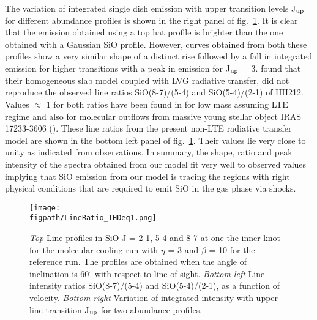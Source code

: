 \documentclass[useAMS,usenatbib]{mn2e}
\newcommand{\figpath}{/Users/bhargavvaidya/MyProject/work/Leeds_Uni/SiOJets_New/PAPER/PFIGS/}
\begin{document}
The variation of integrated single dish emission with upper transition
levels J$_{\rm up}$ for different abundance profiles is shown in the
right panel of fig.~\ref{fig:lineratio}. It is clear that the emission
obtained using a top hat profile is brighter than the one obtained
with a Gaussian SiO profile. However, curves obtained from
both these profiles show a very similar shape of a distinct rise followed by a fall in
integrated emission for higher transitions with a peak in
emission for J$_{\rm up}$ = 3. \cite{Nisini:2007p13128} found that
their homogeneous slab model coupled with LVG radiative transfer, did
not reproduce the observed line ratios SiO(8-7)/(5-4) and
SiO(5-4)/(2-1) of HH212. Values $\approx$ 1 for both ratios have been
found in for low mass assuming LTE regime \citep{Cabrit:2007p13804,
  Lee:2008p13697} and also for molecular outflows from massive
young stellar object IRAS 17233-3606 (\citealt{Leurini:2013p13165}).
These line ratios from the present
non-LTE radiative transfer model are shown in the bottom left panel of
fig.~\ref{fig:lineratio}. Their values lie very close to unity as
indicated from observations. 
In summary, the shape, ratio and peak intensity of the spectra
obtained from our model fit very well to observed values implying
that SiO emission from our model is tracing the regions with right physical
conditions that are required to emit SiO in the gas phase via shocks. 

\begin{figure*}
 \texttt{[image: \\figpath/LineRatio\_THDeq1.png]}
 \caption{{\em{Top}} Line profiles in SiO J = 2-1, 5-4 and 8-7 at one
   the inner knot for the molecular cooling run with $\eta$ = 3 and
   $\beta$ = 10 for the reference run. The profiles are
   obtained when the angle of inclination is 60$^{\circ}$ with respect
 to line of sight. {\em{Bottom left}} Line intensity ratios SiO(8-7)/(5-4)
and SiO(5-4)/(2-1), as a function of velocity. {\em{Bottom right}}
Variation of integrated intensity with upper line transition J$_{\rm
  up}$ for two abundance profiles.}
\label{fig:lineratio}
\end{figure*}
\end{document}
